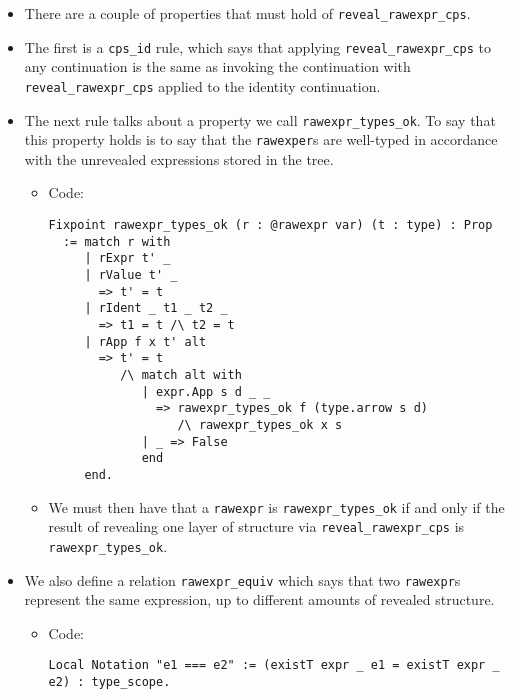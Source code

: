 \begin{itemize}
\begin{itemize}
\begin{itemize}
      \begin{itemize}
      \tightlist
      \item
        There are a couple of properties that must hold of
        \texttt{reveal\_rawexpr\_cps}.
      \item
        The first is a \texttt{cps\_id} rule, which says that applying
        \texttt{reveal\_rawexpr\_cps} to any continuation is the same as
        invoking the continuation with \texttt{reveal\_rawexpr\_cps}
        applied to the identity continuation.
      \item
        The next rule talks about a property we call
        \texttt{rawexpr\_types\_ok}. To say that this property holds is
        to say that the \texttt{rawexper}s are well-typed in accordance
        with the unrevealed expressions stored in the tree.

        \begin{itemize}
        \item
          Code:

\begin{verbatim}
Fixpoint rawexpr_types_ok (r : @rawexpr var) (t : type) : Prop
  := match r with
     | rExpr t' _
     | rValue t' _
       => t' = t
     | rIdent _ t1 _ t2 _
       => t1 = t /\ t2 = t
     | rApp f x t' alt
       => t' = t
          /\ match alt with
             | expr.App s d _ _
               => rawexpr_types_ok f (type.arrow s d)
                  /\ rawexpr_types_ok x s
             | _ => False
             end
     end.
\end{verbatim}
        \item
          We must then have that a \texttt{rawexpr} is
          \texttt{rawexpr\_types\_ok} if and only if the result of
          revealing one layer of structure via
          \texttt{reveal\_rawexpr\_cps} is \texttt{rawexpr\_types\_ok}.
        \end{itemize}
      \item
        We also define a relation \texttt{rawexpr\_equiv} which says
        that two \texttt{rawexpr}s represent the same expression, up to
        different amounts of revealed structure.

        \begin{itemize}
        \item
          Code:

\begin{verbatim}
Local Notation "e1 === e2" := (existT expr _ e1 = existT expr _ e2) : type_scope.


\end{verbatim}
\end{itemize}
\end{itemize}
\end{itemize}
\end{itemize}
\end{itemize}
